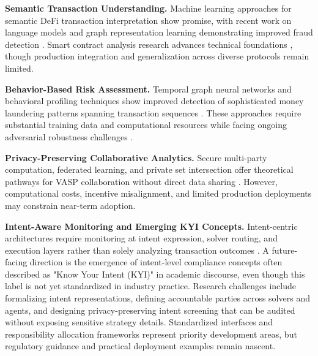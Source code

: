 \noindent\textbf{Semantic Transaction Understanding.}
Machine learning approaches for semantic DeFi transaction interpretation show promise, with recent work on language models and graph representation learning demonstrating improved fraud detection \cite{sun2025ethereumfrauddetection,azad2025machinelearningblockchain}. Smart contract analysis research advances technical foundations \cite{bhargavan2016formalverificationsmart,chen2024safecheckdetectingsmart,liao2024smartcontractvulnerability}, though production integration and generalization across diverse protocols remain limited.

\noindent\textbf{Behavior-Based Risk Assessment.}
Temporal graph neural networks and behavioral profiling techniques show improved detection of sophisticated money laundering patterns spanning transaction sequences \cite{albrecht2019usecryptocurrenciesmoney,cheng2023evolvepathtracer,cheng2024earlydetectionmalicious,arnold2024insightscaveatsmining,ouyang2024bitcoinmoneylaundering,li2025globallocalgraphattention,lin2024denseflowspottingcryptocurrency}. These approaches require substantial training data and computational resources while facing ongoing adversarial robustness challenges \cite{rodriguezvalencia2025systematicreviewartificial}.

\noindent\textbf{Privacy-Preserving Collaborative Analytics.}
Secure multi-party computation, federated learning, and private set intersection offer theoretical pathways for VASP collaboration without direct data sharing \cite{bansod2022challengesmakingblockchain}. However, computational costs, incentive misalignment, and limited production deployments may constrain near-term adoption.

\noindent\textbf{Intent-Aware Monitoring and Emerging KYI Concepts.}
Intent-centric architectures require monitoring at intent expression, solver routing, and execution layers rather than solely analyzing transaction outcomes \cite{mao2025knowyourintent}. A future-facing direction is the emergence of intent-level compliance concepts often described as "Know Your Intent (KYI)" in academic discourse, even though this label is not yet standardized in industry practice. Research challenges include formalizing intent representations, defining accountable parties across solvers and agents, and designing privacy-preserving intent screening that can be audited without exposing sensitive strategy details. Standardized interfaces and responsibility allocation frameworks represent priority development areas, but regulatory guidance and practical deployment examples remain nascent.

